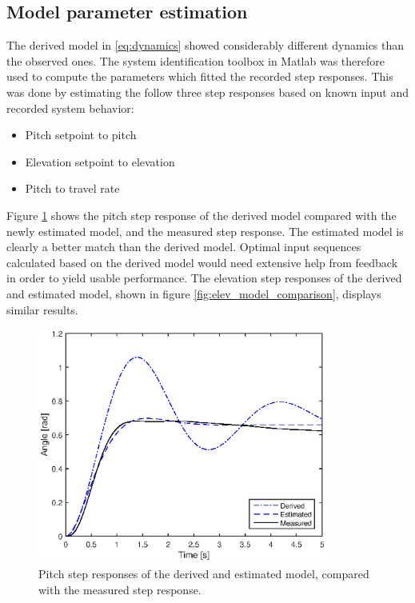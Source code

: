 \subsection{Model parameter estimation}
The derived model in \eqref{eq:dynamics} showed considerably different dynamics than the observed ones. The system identification toolbox in Matlab was therefore used to compute the parameters which fitted the recorded step responses. This was done by estimating the follow three step responses based on known input and recorded system behavior:

\begin{itemize}
	\item{Pitch setpoint to pitch}
	\item{Elevation setpoint to elevation}
	\item{Pitch to travel rate}
\end{itemize}

Figure \ref{fig:pitch_model_comparison} shows the pitch step response of the derived model compared with the newly estimated model, and the measured step response. The estimated model is clearly a better match than the derived model. Optimal input sequences calculated based on the derived model would need extensive help from feedback in order to yield usable performance. The elevation step responses of the derived and estimated model, shown in figure \ref{fig:elev_model_comparison}, displays similar results.

\begin{figure}[hp]
	\centering
		\includegraphics[width=0.85\textwidth]{figures/1/pitch_model_comparison.eps}
	\caption{Pitch step responses of the derived and estimated model, compared with the measured step response.}
	\label{fig:pitch_model_comparison}
\end{figure}

